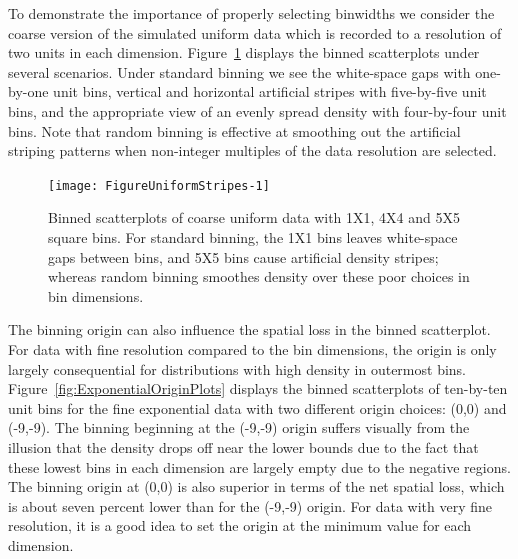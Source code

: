 \documentclass[11pt]{isuthesis}\usepackage[]{graphicx}\usepackage[]{color}
\newenvironment{knitrout}{}{} %
\begin{document}
To demonstrate the importance of properly selecting binwidths we consider the coarse version of the simulated uniform data which is recorded to a resolution of two units in each dimension. Figure~\ref{fig:UniformStripes} displays the binned scatterplots under several scenarios. Under standard binning we see the white-space gaps with one-by-one unit bins, vertical and horizontal artificial stripes with five-by-five unit bins, and the appropriate view of an evenly spread density with four-by-four unit bins.  Note that random binning is effective at smoothing out the artificial striping patterns when non-integer multiples of the data resolution are selected.

\begin{knitrout}
\color{fgcolor}\begin{figure}[h]

{\centering \texttt{[image: FigureUniformStripes-1]} 

}

\caption[Binned scatterplots of coarse uniform data with 1X1, 4X4 and 5X5 square bins]{Binned scatterplots of coarse uniform data with 1X1, 4X4 and 5X5 square bins. For standard binning, the 1X1 bins leaves white-space gaps between bins, and 5X5 bins cause artificial density stripes; whereas random binning smoothes density over these poor choices in bin dimensions.}\label{fig:UniformStripes}
\end{figure}


\end{knitrout}

The binning origin can also influence the spatial loss in the binned scatterplot.  For data with fine resolution compared to the bin dimensions, the origin is only largely consequential for distributions with high density in outermost bins.  Figure~\ref{fig:ExponentialOriginPlots} displays the binned scatterplots of ten-by-ten unit bins for the fine exponential data with two different origin choices: (0,0) and (-9,-9). The binning beginning at the (-9,-9) origin suffers visually from the illusion that the density drops off near the lower bounds due to the fact that these lowest bins in each dimension are largely empty due to the negative regions. The binning origin at (0,0) is also superior in terms of the net spatial loss, which is about seven percent lower than for the (-9,-9) origin. For data with very fine resolution, it is a good idea to set the origin at the minimum value for each dimension. 
\end{document}
